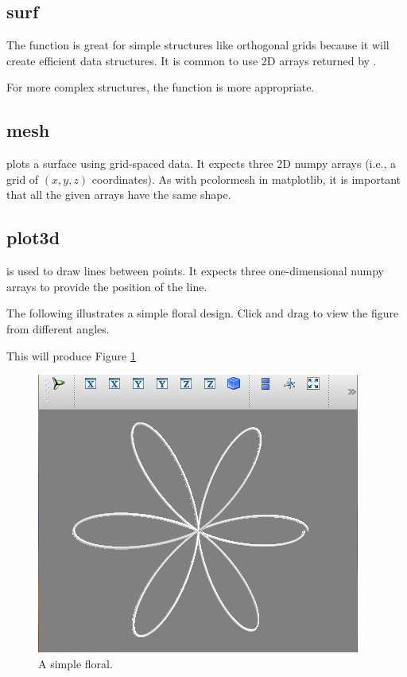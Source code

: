 \subsection*{surf}

The  function is great for simple structures like orthogonal grids 
because it will create efficient data structures. 
It is common to use 2D arrays returned by . 

For more complex structures, the  function is more appropriate. 

\subsection*{mesh}
 plots a surface using grid-spaced data. 
It expects three 2D numpy arrays (i.e., a grid of $(x,y,z)$ coordinates). As with pcolormesh in matplotlib, it is important that 
all the given arrays have the same shape. 

\subsection*{plot3d}
 is used to draw lines between points. It expects three one-dimensional numpy 
arrays to provide the position of the line. 

The following illustrates a simple floral design. Click and drag to view the figure from different angles.



This will produce Figure \ref{mayavi:plot3d.pdf}

\begin{figure} 
\includegraphics[width=\textwidth]{plot3d.pdf}
\caption{A simple floral. } 
\label{mayavi:plot3d.pdf}
\end{figure}


